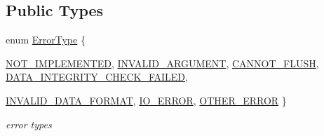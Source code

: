 \subsection*{Public Types}
\begin{DoxyCompactItemize}
\item 
enum \hyperlink{class_exception_a8e53909d979479380e0274807c074c0a}{ErrorType} \{ \par
\hyperlink{class_exception_a8e53909d979479380e0274807c074c0aa1323c0f32eac2f9502b99c5c899ce629}{NOT\_\-IMPLEMENTED}, 
\hyperlink{class_exception_a8e53909d979479380e0274807c074c0aab018a535e00d226178a71d2c5fa800d1}{INVALID\_\-ARGUMENT}, 
\hyperlink{class_exception_a8e53909d979479380e0274807c074c0aa11a8912fe9ae87f7469705b6d5130a06}{CANNOT\_\-FLUSH}, 
\hyperlink{class_exception_a8e53909d979479380e0274807c074c0aa77a639a803cf53052f9c76a0354247e6}{DATA\_\-INTEGRITY\_\-CHECK\_\-FAILED}, 
\par
\hyperlink{class_exception_a8e53909d979479380e0274807c074c0aa3a0352964781e7712b21dbb70ffbe646}{INVALID\_\-DATA\_\-FORMAT}, 
\hyperlink{class_exception_a8e53909d979479380e0274807c074c0aad51c7d0e0156bc1794b3b7f99599aba8}{IO\_\-ERROR}, 
\hyperlink{class_exception_a8e53909d979479380e0274807c074c0aa27d9ee7704100a88e4ae4adcc4072015}{OTHER\_\-ERROR}
 \}
\begin{DoxyCompactList}\small\item\em error types \item\end{DoxyCompactList}\end{DoxyCompactItemize}
